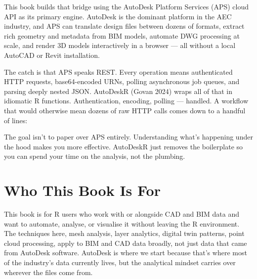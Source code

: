 \documentclass[
  11pt,
  letterpaper,
  DIV=11,
  numbers=noendperiod]{scrreprt}
\newenvironment{Shaded}{\begin{snugshade}}{\end{snugshade}}
\newcommand{\AttributeTok}[1]{\textcolor[rgb]{0.40,0.45,0.13}{#1}}
\newcommand{\FunctionTok}[1]{\textcolor[rgb]{0.28,0.35,0.67}{#1}}
\newcommand{\NormalTok}[1]{\textcolor[rgb]{0.00,0.23,0.31}{#1}}
\newcommand{\OtherTok}[1]{\textcolor[rgb]{0.00,0.23,0.31}{#1}}
\newcommand{\SpecialCharTok}[1]{\textcolor[rgb]{0.37,0.37,0.37}{#1}}
\newcommand{\StringTok}[1]{\textcolor[rgb]{0.13,0.47,0.30}{#1}}
\begin{document}
This book builds that bridge using the AutoDesk Platform Services (APS)
cloud API as its primary engine. AutoDesk is the dominant platform in
the AEC industry, and APS can translate design files between dozens of
formats, extract rich geometry and metadata from BIM models, automate
DWG processing at scale, and render 3D models interactively in a browser
--- all without a local AutoCAD or Revit installation.

The catch is that APS speaks REST. Every operation means authenticated
HTTP requests, base64-encoded URNs, polling asynchronous job queues, and
parsing deeply nested JSON. AutoDeskR (Govan 2024) wraps all of that in
idiomatic R functions. Authentication, encoding, polling --- handled. A
workflow that would otherwise mean dozens of raw HTTP calls comes down
to a handful of lines:

\begin{Shaded}
\end{Shaded}

The goal isn't to paper over APS entirely. Understanding what's
happening under the hood makes you more effective. AutoDeskR just
removes the boilerplate so you can spend your time on the analysis, not
the plumbing.

\section*{Who This Book Is For}\label{who-this-book-is-for}


This book is for R users who work with or alongside CAD and BIM data and
want to automate, analyse, or visualise it without leaving the R
environment. The techniques here, mesh analysis, layer analytics,
digital twin patterns, point cloud processing, apply to BIM and CAD data
broadly, not just data that came from AutoDesk software. AutoDesk is
where we start because that's where most of the industry's data
currently lives, but the analytical mindset carries over wherever the
files come from.
\end{document}
